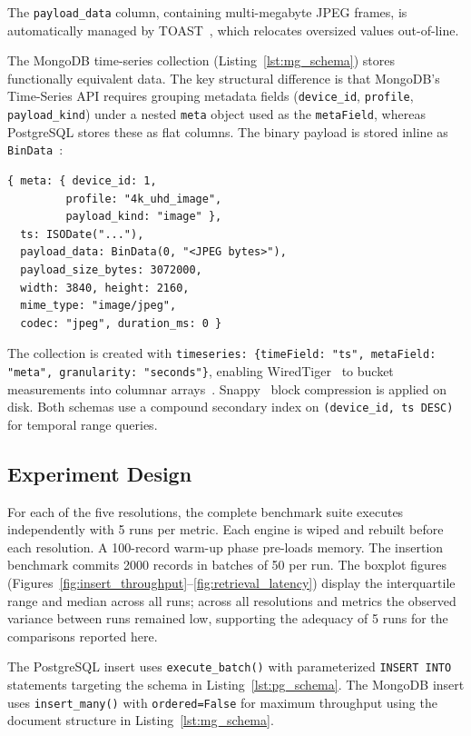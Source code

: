 \documentclass[conference, a4paper]{IEEEtran}
\begin{document}
The \texttt{payload\_data} column, containing multi-megabyte JPEG frames, is automatically managed by TOAST~\cite{postgresql_toast_docs}, which relocates oversized values out-of-line.

The MongoDB time-series collection (Listing~\ref{lst:mg_schema}) stores functionally equivalent data. The key structural difference is that MongoDB's Time-Series API requires grouping metadata fields (\texttt{device\_id}, \texttt{profile}, \texttt{payload\_kind}) under a nested \texttt{meta} object used as the \texttt{metaField}, whereas PostgreSQL stores these as flat columns. The binary payload is stored inline as \texttt{BinData}~\cite{mongodb_bson_spec}:

\begin{lstlisting}[basicstyle=\ttfamily\scriptsize,breaklines=true,caption={MongoDB document structure (per insert).},label={lst:mg_schema}]
{ meta: { device_id: 1,
         profile: "4k_uhd_image",
         payload_kind: "image" },
  ts: ISODate("..."),
  payload_data: BinData(0, "<JPEG bytes>"),
  payload_size_bytes: 3072000,
  width: 3840, height: 2160,
  mime_type: "image/jpeg",
  codec: "jpeg", duration_ms: 0 }
\end{lstlisting}

The collection is created with \texttt{timeseries: \{timeField: "ts", metaField: "meta", granularity: "seconds"\}}, enabling WiredTiger~\cite{mongodb_wiredtiger_storage} to bucket measurements into columnar arrays~\cite{mongodb_ts_best_practices}. Snappy~\cite{google_snappy} block compression is applied on disk. Both schemas use a compound secondary index on \texttt{(device\_id, ts DESC)} for temporal range queries.

\subsection{Experiment Design}
For each of the five resolutions, the complete benchmark suite executes independently with 5 runs per metric. Each engine is wiped and rebuilt before each resolution. A 100-record warm-up phase pre-loads memory. The insertion benchmark commits 2000 records in batches of 50 per run. The boxplot figures (Figures~\ref{fig:insert_throughput}--\ref{fig:retrieval_latency}) display the interquartile range and median across all runs; across all resolutions and metrics the observed variance between runs remained low, supporting the adequacy of 5 runs for the comparisons reported here.

The PostgreSQL insert uses \texttt{execute\_batch()} with parameterized \texttt{INSERT INTO} statements targeting the schema in Listing~\ref{lst:pg_schema}. The MongoDB insert uses \texttt{insert\_many()} with \texttt{ordered=False} for maximum throughput using the document structure in Listing~\ref{lst:mg_schema}.
\end{document}
